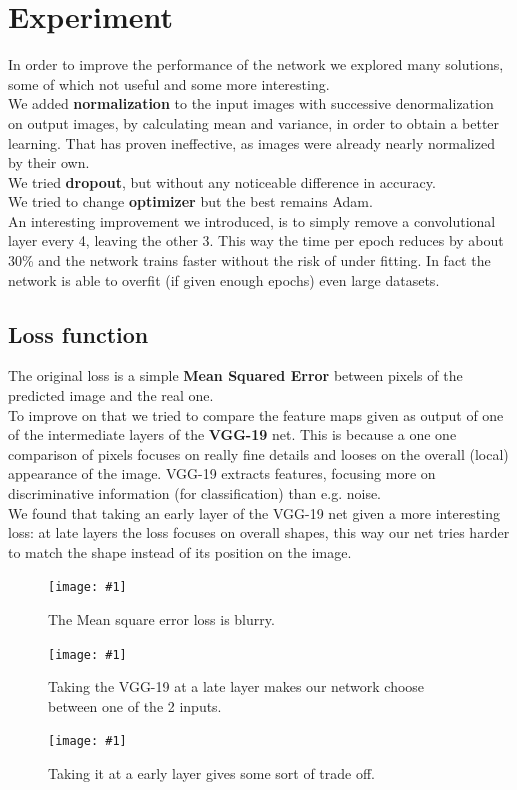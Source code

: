 \documentclass[11pt, a4paper]{article}
\newcommand{\image}[3]{
	\begin{figure}%
		\centering
		\texttt{[image: \#1]}
		\caption{#2.}
		\label{#3}
	\end{figure}
}
\begin{document}
	\section{Experiment} %
	In order to improve the performance of the network we explored many solutions, some of which not useful and some more interesting.\\
	We added \textbf{normalization} to the input images with successive denormalization on output images, by calculating mean and variance, in order to obtain a better learning. That has proven ineffective, as images were already nearly normalized by their own. \\
	We tried \textbf{dropout}, but without any noticeable difference in accuracy.\\
	We tried to change \textbf{optimizer} but the best remains Adam.\\
	An interesting improvement we introduced, is to simply remove a convolutional layer every 4, leaving the other 3. This way the time per epoch reduces by about 30\% and the network trains faster without the risk of under fitting. In fact the network is able to overfit (if given enough epochs) even large datasets.
	
	\subsection{Loss function}
	The original loss is a simple \textbf{Mean Squared Error} between pixels of the predicted image and the real one. \\
	To improve on that we tried to compare the feature maps given as output of one of the intermediate layers of the \textbf{VGG-19} net. This is because a one one comparison of pixels focuses on really fine details and looses on the overall (local) appearance of the image. VGG-19 extracts features, focusing more on discriminative information (for classification) than e.g. noise. \\
	We found that taking an early layer of the VGG-19 net given a more interesting loss: at late layers the loss focuses on overall shapes, this way our net tries harder to match the shape instead of its position on the image. 
	\image{mse_loss2}{The Mean square error loss is blurry}{loss-mse}
	\image{vgg16_relu4_4_loss2}{Taking the VGG-19 at a late layer makes our network choose between one of the 2 inputs}{loss-vgg19-44}
	\image{vgg16_relu2_1_loss2}{Taking it at a early layer gives some sort of trade off}{loss-vgg19-21}
	
\end{document}
